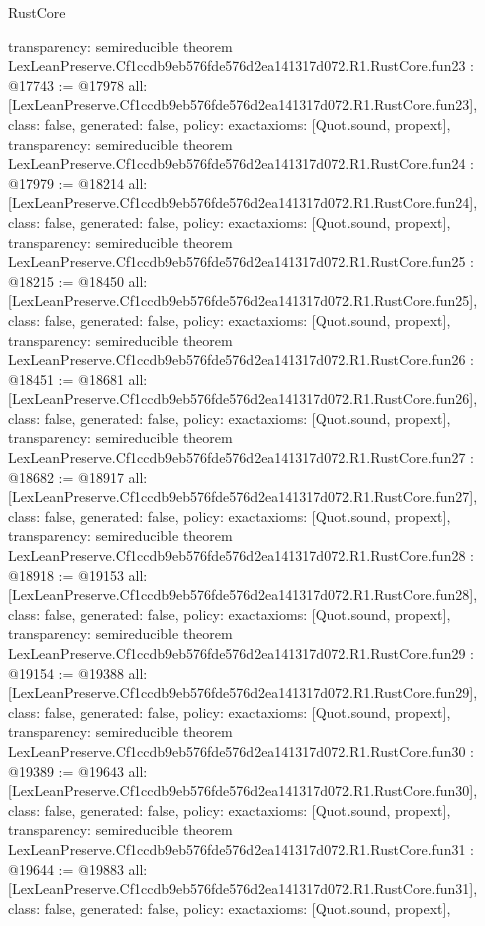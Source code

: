 \begin{lexlean}{RustCore}
\begin{coremodule}
{  transparency: semireducible
}
theorem LexLeanPreserve.Cf1ccdb9eb576fde576d2ea141317d072.R1.RustCore.fun23 : @17743 := @17978 {
  all: [LexLeanPreserve.Cf1ccdb9eb576fde576d2ea141317d072.R1.RustCore.fun23],
  class: false,
  generated: false,
  policy: exact{axioms: [Quot.sound, propext]},
  transparency: semireducible
}
theorem LexLeanPreserve.Cf1ccdb9eb576fde576d2ea141317d072.R1.RustCore.fun24 : @17979 := @18214 {
  all: [LexLeanPreserve.Cf1ccdb9eb576fde576d2ea141317d072.R1.RustCore.fun24],
  class: false,
  generated: false,
  policy: exact{axioms: [Quot.sound, propext]},
  transparency: semireducible
}
theorem LexLeanPreserve.Cf1ccdb9eb576fde576d2ea141317d072.R1.RustCore.fun25 : @18215 := @18450 {
  all: [LexLeanPreserve.Cf1ccdb9eb576fde576d2ea141317d072.R1.RustCore.fun25],
  class: false,
  generated: false,
  policy: exact{axioms: [Quot.sound, propext]},
  transparency: semireducible
}
theorem LexLeanPreserve.Cf1ccdb9eb576fde576d2ea141317d072.R1.RustCore.fun26 : @18451 := @18681 {
  all: [LexLeanPreserve.Cf1ccdb9eb576fde576d2ea141317d072.R1.RustCore.fun26],
  class: false,
  generated: false,
  policy: exact{axioms: [Quot.sound, propext]},
  transparency: semireducible
}
theorem LexLeanPreserve.Cf1ccdb9eb576fde576d2ea141317d072.R1.RustCore.fun27 : @18682 := @18917 {
  all: [LexLeanPreserve.Cf1ccdb9eb576fde576d2ea141317d072.R1.RustCore.fun27],
  class: false,
  generated: false,
  policy: exact{axioms: [Quot.sound, propext]},
  transparency: semireducible
}
theorem LexLeanPreserve.Cf1ccdb9eb576fde576d2ea141317d072.R1.RustCore.fun28 : @18918 := @19153 {
  all: [LexLeanPreserve.Cf1ccdb9eb576fde576d2ea141317d072.R1.RustCore.fun28],
  class: false,
  generated: false,
  policy: exact{axioms: [Quot.sound, propext]},
  transparency: semireducible
}
theorem LexLeanPreserve.Cf1ccdb9eb576fde576d2ea141317d072.R1.RustCore.fun29 : @19154 := @19388 {
  all: [LexLeanPreserve.Cf1ccdb9eb576fde576d2ea141317d072.R1.RustCore.fun29],
  class: false,
  generated: false,
  policy: exact{axioms: [Quot.sound, propext]},
  transparency: semireducible
}
theorem LexLeanPreserve.Cf1ccdb9eb576fde576d2ea141317d072.R1.RustCore.fun30 : @19389 := @19643 {
  all: [LexLeanPreserve.Cf1ccdb9eb576fde576d2ea141317d072.R1.RustCore.fun30],
  class: false,
  generated: false,
  policy: exact{axioms: [Quot.sound, propext]},
  transparency: semireducible
}
theorem LexLeanPreserve.Cf1ccdb9eb576fde576d2ea141317d072.R1.RustCore.fun31 : @19644 := @19883 {
  all: [LexLeanPreserve.Cf1ccdb9eb576fde576d2ea141317d072.R1.RustCore.fun31],
  class: false,
  generated: false,
  policy: exact{axioms: [Quot.sound, propext]},
}
\end{coremodule}
\end{lexlean}
